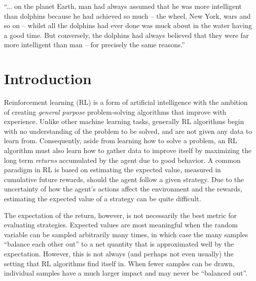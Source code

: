 \begin{savequote}[0.55\linewidth]
  ``... on the planet Earth, man had always assumed that he was more
  intelligent than dolphins because he had achieved so much -- the
  wheel, New York, wars and so on -- whilst all the dolphins had ever
  done was muck about in the water having a good time. But conversely,
  the dolphins had always believed that they were far more intelligent
  than man -- for precisely the same reasons.''
\end{savequote}

\chapter{Introduction}
Reinforcement learning (RL) is a form of artificial intelligence with the
ambition of creating \emph{general purpose} problem-solving algorithms
that improve with experience. Unlike other machine learning tasks,
generally RL algorithms begin with no understanding of the problem to
be solved, and are not given any data to learn from. Consequently,
aside from learning how to solve a problem, an RL algorithm must also
learn how to gather data to improve itself by maximizing the long term
\emph{returns} accumulated by the agent due to good behavior. A common paradigm in RL is
based on estimating the expected value, measured in cumulative future
rewards, should the agent follow a given strategy. Due to the
uncertainty of how the agent's actions affect the environment and the rewards,
estimating the expected value of a strategy can be quite difficult.

The expectation of the return, however, is not necessarily the best metric for
evaluating strategies. Expected values are most meaningful when the
random variable can be sampled arbitrarily many times, in which case
the many samples ``balance each other out'' to a net quantity that is
approximated well by the expectation. However, this is not always (and
perhaps not even usually) the setting that RL algorithms find
itself in. When fewer samples can be drawn, individual samples
have a much larger impact and may never be ``balanced out''.

